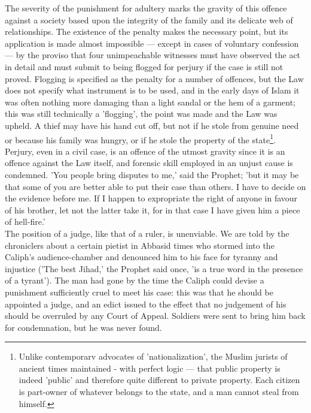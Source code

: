 \documentclass[11pt, b5paper, twoside]{book}
\begin{document}
The severity of the punishment for adultery marks the gravity of this offence against a society based 
upon the integrity of the family and its delicate web of relationships. The existence of the penalty 
makes the necessary point, but its application is made almost impossible --- except in cases of 
voluntary confession --- by the proviso that four unimpeachable witnesses must have observed the act in 
detail and must submit to being flogged for perjury if the case is still not proved. Flogging is 
specified as the penalty for a number of offences, but the Law does not specify what instrument is to 
be used, and in the early days of Islam it was often nothing more damaging than a light sandal or the 
hem of a garment; this was still technically a 'flogging', the point was made and the Law was upheld. 
A thief may have his hand cut off, but not if he stole from genuine need or because his family was 
hungry, or if he stole the property of the state\footnote{Unlike contemporarv advocates of 'nationalization', the Muslim jurists of ancient times maintained 
- with perfect logic --- that public property is indeed 'public' and therefore quite different to 
private property. Each citizen is part-owner of whatever belongs to the state, and a man cannot steal 
from himself.}. \\

Perjury, even in a civil case, is an offence of the utmost gravity since it is an offence against the 
Law itself, and forensic skill employed in an unjust cause is condemned. 'You people bring disputes 
to me,' said the Prophet; 'but it may be that some of you are better able to put their case than 
others. I have to decide on the evidence before me. If I happen to expropriate the right of anyone in 
favour of his brother, let not the latter take it, for in that case I have given him a piece of 
hell-fire.' \\

The position of a judge, like that of a ruler, is unenviable. We are told by the chroniclers about a 
certain pietist in Abbasid times who stormed into the Caliph's audience-chamber and denounced him to 
his face for tyranny and injustice ('The best Jihad,' the Prophet said once, 'is a true word in the 
presence of a tyrant'). The man had gone by the time the Caliph could devise a punishment 
sufficiently cruel to meet his case: this was that he should be appointed a judge, and an edict 
issued to the effect that no judgement of his should be overruled by any Court of Appeal. Soldiers 
were sent to bring him back for condemnation, but he was never found. \\
\end{document}
